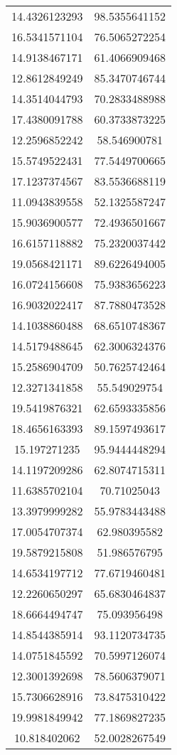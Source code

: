 \begin{table}
\begin{tabular}{cc}
14.4326123293 & 98.5355641152 \\
16.5341571104 & 76.5065272254 \\
14.9138467171 & 61.4066909468 \\
12.8612849249 & 85.3470746744 \\
14.3514044793 & 70.2833488988 \\
17.4380091788 & 60.3733873225 \\
12.2596852242 & 58.546900781 \\
15.5749522431 & 77.5449700665 \\
17.1237374567 & 83.5536688119 \\
11.0943839558 & 52.1325587247 \\
15.9036900577 & 72.4936501667 \\
16.6157118882 & 75.2320037442 \\
19.0568421171 & 89.6226494005 \\
16.0724156608 & 75.9383656223 \\
16.9032022417 & 87.7880473528 \\
14.1038860488 & 68.6510748367 \\
14.5179488645 & 62.3006324376 \\
15.2586904709 & 50.7625742464 \\
12.3271341858 & 55.549029754 \\
19.5419876321 & 62.6593335856 \\
18.4656163393 & 89.1597493617 \\
15.197271235 & 95.9444448294 \\
14.1197209286 & 62.8074715311 \\
11.6385702104 & 70.71025043 \\
13.3979999282 & 55.9783443488 \\
17.0054707374 & 62.980395582 \\
19.5879215808 & 51.986576795 \\
14.6534197712 & 77.6719460481 \\
12.2260650297 & 65.6830464837 \\
18.6664494747 & 75.093956498 \\
14.8544385914 & 93.1120734735 \\
14.0751845592 & 70.5997126074 \\
12.3001392698 & 78.5606379071 \\
15.7306628916 & 73.8475310422 \\
19.9981849942 & 77.1869827235 \\
10.818402062 & 52.0028267549 \\

\end{tabular}
\end{table}
